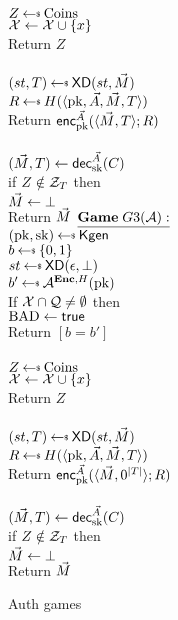 \begin{figure}[tbhp]
\begin{center}
{\medskip
{}\\
  $Z \getsr \mathrm{Coins}$\\
  $\mathcal{X} \gets \mathcal{X} \cup \{x\}$\\
  Return $Z$\\
  
  \medskip
\procedurev{$\encOracle(\vad,\vmsg)$}\\
$(st, T) \getsr \mdalg(st,\vmsg)$\\
$R \getsr H(\langle \pk,\vad,\vmsg,\umd\rangle)$\\
Return ${\mathsf{enc}}_{\mathrm{pk}}^{\vec{A}}(\langle \vec{M},T\rangle; R)$\\

\medskip
{}\\
$(\vec{M},T) \gets {\mathsf{dec}}_{\mathrm{sk}}^{\vec{A}}(C)$\\
if $Z \notin \mathcal{Z}_T$ then\\
\nudge $\vec{M} \gets \bot$\\
Return $\vec{M}$
}
{
$\gamev{G3}{\advA}$\\
 $(\pk,\sk)\getsr\Kgen$\\
 $b \getsr \bits$ \\
 $st \getsr \mdalg(\epsilon,\bot)$\\
 $b' \getsr \advA^{\encOracle,H}(\pk)$\\
 If $\mathcal{X} \cap \mathcal{Q} \neq \emptyset$ then \\
\nudge $\mathrm{BAD} \gets\textsf{true}$\\
Return $[b=b']$\\ 

\medskip
{}\\
  $Z \getsr \mathrm{Coins}$\\
  $\mathcal{X} \gets \mathcal{X} \cup \{x\}$\\
  Return $Z$\\
  
  \medskip
\procedurev{$\encOracle(\vad,\vmsg)$}\\
$(st, T) \getsr \mdalg(st,\vmsg)$\\
$R \getsr H(\langle \pk,\vad,\vmsg,\umd\rangle)$\\
Return ${\mathsf{enc}}_{\mathrm{pk}}^{\vec{A}}(\langle \vec{M},0^{|T|}\rangle; R)$\\

\medskip
{}\\
$(\vec{M},T) \gets {\mathsf{dec}}_{\mathrm{sk}}^{\vec{A}}(C)$\\
if $Z \notin \mathcal{Z}_T$ then\\
\nudge $\vec{M} \gets \bot$\\
Return $\vec{M}$
}
\caption{Auth games}
\end{center}
\end{figure}

